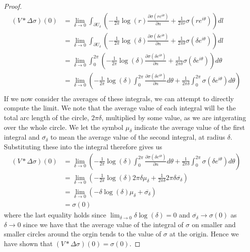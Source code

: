 \documentclass[11pt]{report}
\theoremstyle{definition}
\begin{document}
\begin{proof}
  \begin{align*}
    (V * \Delta \sigma)(0) &= \lim_{\delta \rightarrow 0} \int_{\partial U_{\delta}}\left( -\frac{1}{2\pi}\log(r)\frac{\partial \sigma(re^{i\theta})}{\partial n} + \frac{1}{2\pi r}\sigma(re^{i\theta})\right)dl \\
    &= \lim_{\delta \rightarrow 0} \int_{\partial U_{\delta}}\left( -\frac{1}{2\pi}\log(\delta)\frac{\partial \sigma(\delta e^{i\theta})}{\partial n} + \frac{1}{2\pi \delta}\sigma(\delta e^{i\theta})\right)dl \\
    &= \lim_{\delta \rightarrow 0} \int_{0}^{2\pi}\left( -\frac{1}{2\pi}\log(\delta)\frac{\partial \sigma(\delta e^{i\theta})}{\partial n} + \frac{1}{2\pi \delta}\sigma(\delta e^{i\theta})\right)d\theta \\
    &= \lim_{\delta \rightarrow 0} \left( -\frac{1}{2\pi}\log(\delta) \int_{0}^{2\pi} \frac{\partial \sigma(\delta e^{i\theta})}{\partial n} d\theta + \frac{1}{2\pi \delta}\int_{0}^{2\pi}\sigma(\delta e^{i\theta})d\theta\right) \\
  \end{align*}
  If we now consider the averages of these integrals, we can attempt to directly compute the limit. We note that the average value of each integral will be the total arc length of the circle, $2\pi \delta$, multiplied by some value, as we are intgerating over the whole circle. We let the symbol $\mu_{\delta}$ indicate the average value of the first integral and $\overline{\sigma_{\delta}}$ to mean the average value of the second integral, at radius $\delta$. Substituting these into the integral therefore gives us
  \begin{align*}
    (V * \Delta \sigma)(0) &=\lim_{\delta \rightarrow 0} \left( -\frac{1}{2\pi}\log(\delta) \int_{0}^{2\pi} \frac{\partial \sigma(\delta e^{i\theta})}{\partial n} d\theta + \frac{1}{2\pi \delta}\int_{0}^{2\pi}\sigma(\delta e^{i\theta})d\theta\right) \\
    &= \lim_{\delta \rightarrow 0} \left( -\frac{1}{2\pi}\log(\delta)2\pi \delta \mu_{\delta}  +  \frac{1}{2\pi \delta} 2\pi \delta \overline{\sigma_{\delta}}\right) \\
    &= \lim_{\delta \rightarrow 0} \left( -\delta \log(\delta)  \mu_{\delta}  + \overline{\sigma_{\delta}}\right) \\
    &= \sigma(0)
  \end{align*}
  where the last equality holds since $\lim_{\delta \rightarrow 0}\delta \log(\delta) = 0$ and $\overline{\sigma_{\delta}} \rightarrow \sigma(0)$ as $\delta \rightarrow 0$ since we have that the average value of the integral of $\sigma$ on smaller and smaller circles around the orgin tends to the value of $\sigma$ at the origin.
  Hence we have shown that $(V * \Delta \sigma)(0) = \sigma(0)$.


\end{proof}
\end{document}
